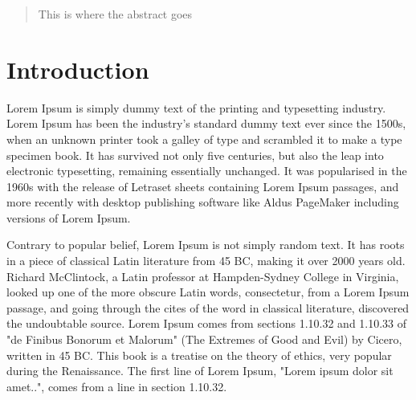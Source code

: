 \documentclass[letterpaper, 10pt, conference, compsocconf]{IEEEtran}
\begin{document}
\maketitle


\begin{abstract}
This is where the abstract goes
\end{abstract}



%
\IEEEpeerreviewmaketitle

\section{Introduction}


Lorem Ipsum is simply dummy text of the printing and typesetting industry. Lorem Ipsum has been the
industry's standard dummy text ever since the 1500s, when an unknown printer took a galley of type
and scrambled it to make a type specimen book. It has survived not only five centuries, but also the
leap into electronic typesetting, remaining essentially unchanged. It was popularised in the 1960s
with the release of Letraset sheets containing Lorem Ipsum passages, and more recently with desktop
publishing software like Aldus PageMaker including versions of Lorem Ipsum.

Contrary to popular belief, Lorem Ipsum is not simply random text. It has roots in a piece of
classical Latin literature from 45 BC, making it over 2000 years old. Richard McClintock, a Latin
professor at Hampden-Sydney College in Virginia, looked up one of the more obscure Latin words,
consectetur, from a Lorem Ipsum passage, and going through the cites of the word in classical
literature, discovered the undoubtable source. Lorem Ipsum comes from sections 1.10.32 and 1.10.33
of "de Finibus Bonorum et Malorum" (The Extremes of Good and Evil) by Cicero, written in 45 BC. This
book is a treatise on the theory of ethics, very popular during the Renaissance. The first line of
Lorem Ipsum, "Lorem ipsum dolor sit amet..", comes from a line in section 1.10.32.
\end{document}
